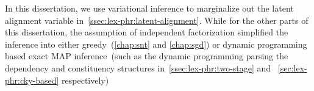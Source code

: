 In this dissertation, we use variational inference to marginalize out the
latent alignment variable
in~\autoref{ssec:lex-phr:latent-alignment}. While for the other parts
of this dissertation, the assumption of independent factorization simplified
the inference into either greedy~(\autoref{chap:snt} and
\autoref{chap:sgd}) or dynamic programming based exact MAP
inference~(such as the dynamic programming parsing the dependency and
constituency structures in~\autoref{ssec:lex-phr:two-stage} and
~\autoref{sec:lex-phr:cky-based} respectively)

